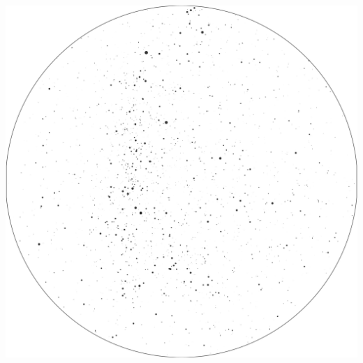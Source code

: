 \documentclass{./SAS-class-skygen}
\begin{document}
	\vspace{0.5cm}
    \begin{center}
    \includegraphics[width=\textwidth]{./pics/skychart53.png}
    \end{center}
    
    
\end{document}
